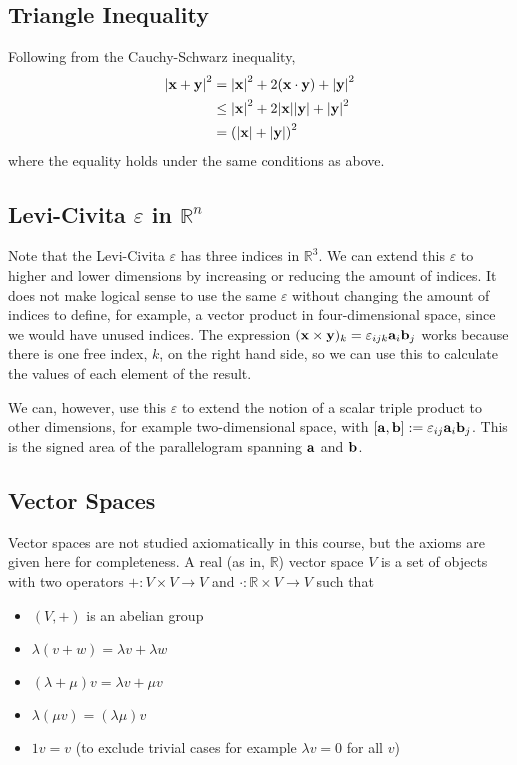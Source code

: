 \documentclass{article}
\begin{document}
\subsection{Triangle Inequality}
Following from the Cauchy-Schwarz inequality,
\begin{align*}
	\abs{\vb x + \vb y}^2
	 & = \abs{\vb x}^2 + 2(\vb x \cdot \vb y) + \abs{\vb y}^2        \\
	 & \leq \abs{\vb x}^2 + 2 \abs{\vb x}\abs{\vb y} + \abs{\vb y}^2 \\
	 & = \left(\abs{\vb x} + \abs{\vb y}\right)^2
\end{align*}
where the equality holds under the same conditions as above.

\subsection{Levi-Civita $\varepsilon$ in $\mathbb R^n$}
Note that the Levi-Civita $\varepsilon$ has three indices in $\mathbb R^3$. We can extend this $\varepsilon$ to higher and lower dimensions by increasing or reducing the amount of indices. It does not make logical sense to use the same $\varepsilon$ without changing the amount of indices to define, for example, a vector product in four-dimensional space, since we would have unused indices. The expression $(\vb x \times \vb y)_k = \varepsilon_{ijk} \vb a_i \vb b_j$ works because there is one free index, $k$, on the right hand side, so we can use this to calculate the values of each element of the result.

We can, however, use this $\varepsilon$ to extend the notion of a scalar triple product to other dimensions, for example two-dimensional space, with $[\vb a, \vb b] := \varepsilon_{ij} \vb a_i \vb b_j$. This is the signed area of the parallelogram spanning $\vb a$ and $\vb b$.

\subsection{Vector Spaces}
Vector spaces are not studied axiomatically in this course, but the axioms are given here for completeness. A real (as in, $\mathbb R$) vector space $V$ is a set of objects with two operators $+: V \times V \to V$ and $\cdot: \mathbb R \times V \to V$ such that
\begin{itemize}
	\item $(V, +)$ is an abelian group
	\item $\lambda(v + w) = \lambda v + \lambda w$
	\item $(\lambda + \mu)v = \lambda v + \mu v$
	\item $\lambda(\mu v) = (\lambda \mu) v$
	\item $1v = v$ (to exclude trivial cases for example $\lambda v = 0$ for all $v$)
\end{itemize}
\end{document}
